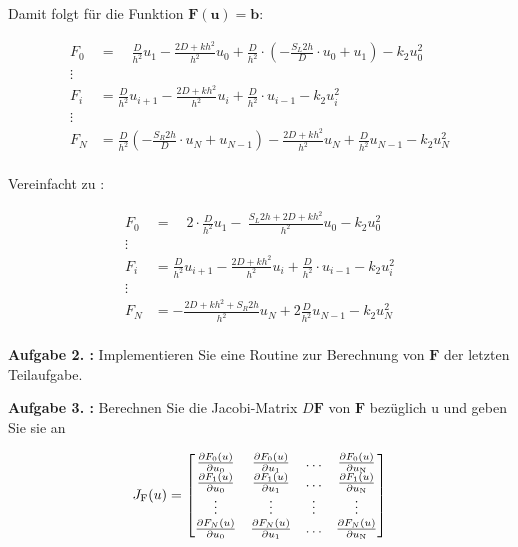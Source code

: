 Damit folgt für die Funktion $\mathbf{F}(\mathbf{u})=\mathbf{b}$:

\begin{align*}
	F_0&= \quad \frac{D}{h^2}u_1-\frac{2D+kh^2}{h^2}u_0+\frac{D}{h^2}\cdot\left( -\frac{S_L 2h}{D}\cdot u_0+u_1\right) -k_2u_0^2\\
	\vdots \\
	F_i&= 	\frac{D}{h^2}u_{i+1}-\frac{2D+kh^2}{h^2}u_i+\frac{D}{h^2}\cdot u_{i-1} -k_2u_i^2\\
	\vdots \\
	F_N &= \frac{D}{h^2}\left( -\frac{S_R2h}{D}\cdot u_N+u_{N-1}\right) -\frac{2D+kh^2}{h^2}u_N+\frac{D}{h^2} u_{N-1}-k_2u^2_N\\
\end{align*}

\begin{qed}
	Vereinfacht zu :
	
	\begin{align*}
		F_0&= \quad 2\cdot \frac{D}{h^2}u_1-\ \frac{S_L2h+2D+kh^2}{h^2} u_0 -k_2u_0^2\\
		\vdots \\
		F_i&= 	\frac{D}{h^2}u_{i+1}-\frac{2D+kh^2}{h^2}u_i+\frac{D}{h^2}\cdot u_{i-1} -k_2u_i^2\\
		\vdots \\
		F_N &= -\frac{2D+kh^2+S_R2h}{h^2}u_N+2\frac{D}{h^2}u_{N-1}-k_2u^2_N\\
	\end{align*}
\end{qed}

\begin{mybox}
	\textbf{Aufgabe 2. :} Implementieren Sie eine Routine zur Berechnung von $\mathbf{F}$ der letzten Teilaufgabe.\cite{Prof.Dr.AndreasZeiser.April2021}
\end{mybox}

\begin{figure}[htb]
	
\end{figure}

\begin{mybox}
	\textbf{Aufgabe 3. :} Berechnen Sie die Jacobi-Matrix $D\mathbf{F}$ von $\mathbf{F}$ bezüglich u und geben Sie sie an
\end{mybox}
\begin{equation}
	J_\mathrm{F}(u)=
	\begin{bmatrix}
		\pdv{F_0(u)}{u_0} & \pdv{F_0(u)}{u_1} & \dots & \pdv{F_0(u)}{u_\mathrm{N}} \\
			\pdv{F_1(u)}{u_0} & \pdv{F_1(u)}{u_1} & \dots & \pdv{F_1(u)}{u_\mathrm{N}} \\
			\vdots & \vdots & \vdots & \vdots \\
			\pdv{F_N(u)}{u_0} & \pdv{F_N(u)}{u_1} & \dots & \pdv{F_N(u)}{u_\mathrm{N}}		
		
	\end{bmatrix}
\end{equation}


